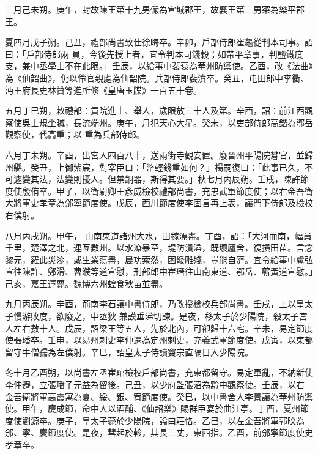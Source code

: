 \begin{pinyinscope}
 三月己未朔。庚午，封故陳王第十九男儼為宣城郡王，故襄王第三男寀為樂平郡王。



 夏四月戊子朔。己丑，禮部尚書致仕徐晦卒。辛卯，戶部侍郎崔龜從判本司事。詔曰：「戶部侍郎兩
 員，今後先授上者，宜令判本司錢穀；如帶平章事，判鹽鐵度支，兼中丞學士不在此限。」壬辰，以給事中裴袞為華州防禦使。乙酉，改《法曲》為《仙韶曲》，仍以伶官親處為仙韶院。兵部侍郎裴濆卒。癸丑，屯田郎中李衢、沔王府長史林贊等進所修《皇唐玉牒》一百五十卷。



 五月丁巳朔，敕禮部：貢院進士、舉人，歲限放三十人及第。辛酉，詔：前江西觀察使吳士規坐贓，長流端州。庚午，月犯天心大星。癸未，以吏部侍郎高鍇為鄂岳觀察使，代高重；以
 重為兵部侍郎。



 六月丁未朔。辛酉，出宮人四百八十，送兩街寺觀安置。廢晉州平陽院礬官，並歸州縣。癸丑，上御紫宸，對宰臣曰：「幣輕錢重如何？」楊嗣復曰：「此事已久，不可遽變其法，法變則擾人。但禁銅器，斯得其要。」秋七月丙辰朔。壬戌，陳許節度使殷侑卒。甲子，以衛尉卿王彥威檢校禮部尚書，充忠武軍節度使；以右金吾衛大將軍史孝章為邠寧節度使。戊辰，西川節度使李固言再上表，讓門下侍郎及檢校右僕射。



 八月丙戌朔。甲午，
 山南東道諸州大水，田稼漂盡。丁酉，詔：「大河而南，幅員千里，楚澤之北，連亙數州。以水潦暴至，堤防潰溢，既壞廬舍，復損田苗。言念黎元，羅此災沴，或生業蕩盡，農功索然，困餧雕殘，豈能自濟。宜令給事中盧弘宣往陳許、鄭滑、曹濮等道宣慰，刑部郎中崔瑨往山南東道、鄂岳、蘄黃道宣慰。」己亥，嘉王運薨。魏博六州蝗食秋苗並盡。



 九月丙辰朔。辛酉，荊南李石讓中書侍郎，乃改授檢校兵部尚書。壬戌，上以皇太子慢游敗度，欲廢之，中丞狄
 兼謨垂涕切諫。是夜，移太子於少陽院，殺太子宮人左右數十人。戊辰，詔梁王等五人，先於北內，可卻歸十六宅。辛未，易定節度使張璠卒。壬申，以易州刺史李仲遷為定州刺史，充義武軍節度使。戊寅，以東都留守牛僧孺為左僕射。辛巳，詔皇太子侍讀竇宗直隔日入少陽院。



 冬十月乙酉朔，以尚書左丞崔琯檢校戶部尚書，充東都留守。易定軍亂，不納新使李仲遷，立張璠子元益為留後。己丑，以少府監張沼為黔中觀察使。壬辰，以右
 金吾衛將軍高霞寓為夏、綏、銀、宥節度使。癸巳，以中書舍人李景讓為華州防禦使。甲午，慶成節，命中人以酒酺、《仙韶樂》賜群臣宴於曲江亭。丁酉，夏州節度使劉源卒。庚子，皇太子薨於少陽院，謚曰莊恪。乙巳，以左金吾將軍郭旼為邠、寧、慶節度使。是夜，彗起於軫，其長三丈，東西指。乙酉，前邠寧節度使史孝章卒。




\end{pinyinscope}
